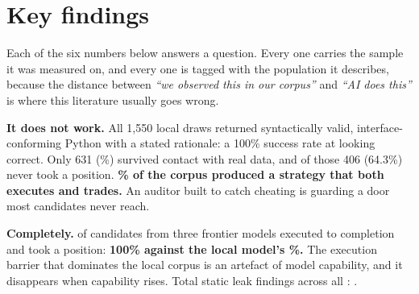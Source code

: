\documentclass[11pt,a4paper]{article}
\begin{document}
\begin{abstract}
\medskip\noindent
\textbf{Better code did not become better evidence.} We report that as the benchmark's first
entry rather than as a result to be improved upon: the environment, the protocol and the
fixtures are independent of whether our auditor worked, and a stronger auditor can contest the
second claim against exactly the same apparatus.
\end{abstract}

\vspace{0.2em}

\section*{Key findings}
\addcontentsline{toc}{section}{Key findings}

Each of the six numbers below answers a question. Every one carries the sample it was measured
on, and every one is tagged with the population it describes, because the distance between
\emph{``we observed this in our corpus''} and \emph{``AI does this''} is where this literature
usually goes wrong.

\begin{finding}[title={1.\ \ Does the AI cheat, or does it simply not work? \hfill\taglocal}]
\textbf{It does not work.} All 1{,}550 local draws returned syntactically valid, interface-conforming
Python with a stated rationale: a 100\% success rate at looking correct. Only 631 (\pgmLocalExec\%)
survived contact with real data, and of those 406 (64.3\%) never took a position.
\textbf{\pgmLocalTrade\% of the corpus produced a strategy that both executes and trades.}
An auditor built to catch cheating is guarding a door most candidates never reach.
\end{finding}

\begin{finding}[title={2.\ \ Do frontier models fix that? \hfill\tagfrontier}]
\textbf{Completely.} \aaGvTotal{} of \aaGvTotal{} candidates from three frontier models executed to
completion and took a position: \textbf{100\% against the local model's \pgmLocalTrade\%.}
The execution barrier that dominates the local corpus is an artefact of model capability, and it
disappears when capability rises. Total static leak findings across all \aaGvTotal{}:
\aaGvStaticTotal{}.
\end{finding}
\end{document}
